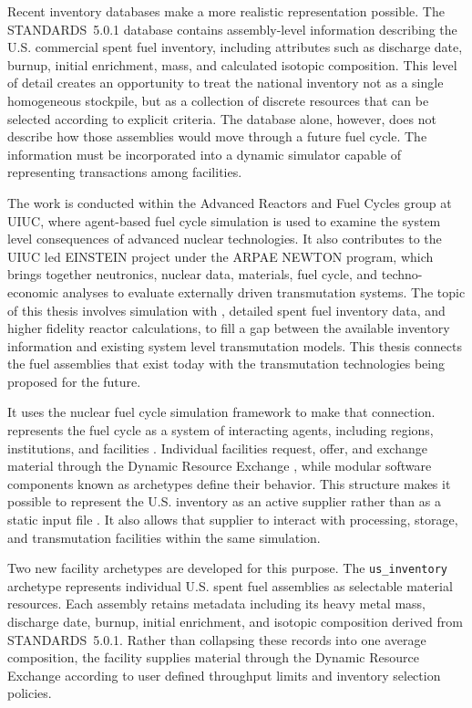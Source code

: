 Recent inventory databases make a more realistic representation possible.
The \gls{STANDARDS}~5.0.1 database \cite{peterson_unf-st&dards_2017,peterson_additional_2017}
contains assembly-level information describing
the U.S. commercial spent fuel inventory, including attributes such as
discharge date, burnup, initial enrichment, mass, and calculated isotopic
composition. This level of detail creates an opportunity to treat the
national inventory not as a single homogeneous stockpile, but as a collection
of discrete resources that can be selected according to explicit criteria.
The database alone, however, does not describe how those assemblies would
move through a future fuel cycle. The information must be incorporated into a
dynamic simulator capable of representing transactions among facilities.

The work is conducted within the Advanced Reactors and Fuel Cycles group at
\gls{UIUC}, where agent-based fuel cycle simulation is used to examine the
system level consequences of advanced nuclear technologies. It also
contributes to the UIUC led \gls{EINSTEIN} project under the \gls{ARPAE} \gls{NEWTON} program,
which brings together neutronics, nuclear data, materials, fuel cycle, and
techno-economic analyses to evaluate externally driven transmutation systems.
The topic of this thesis involves simulation with \Cyclus,
detailed spent fuel inventory data, and higher fidelity reactor calculations,
to fill a gap between the available inventory information and
existing system level transmutation models.
This thesis connects the fuel assemblies that exist today with the
transmutation technologies being proposed for the future.

It uses the \Cyclus nuclear fuel cycle simulation framework to make
that connection. \Cyclus represents the fuel cycle as a system of interacting
agents, including regions, institutions, and facilities \cite{huff_fundamental_2016}. Individual
facilities request, offer, and exchange material through the Dynamic Resource
Exchange \cite{giddenMethodologyDeterminingDynamic2016},
while modular software components known as archetypes define their
behavior. This structure makes it possible to represent the U.S. inventory as
an active supplier rather than as a static input file \cite{bae_deep_2020}. It also allows that
supplier to interact with processing, storage, and transmutation facilities
within the same simulation.

Two new facility archetypes are developed for this purpose. The
\texttt{us\_inventory} archetype represents individual U.S. spent fuel
assemblies as selectable material resources. Each assembly retains metadata
including its heavy metal mass, discharge date, burnup, initial enrichment,
and isotopic composition derived from \gls{STANDARDS}~5.0.1.
Rather than collapsing these records into one average composition, the facility supplies
material through the \Cyclus Dynamic Resource Exchange according to
user defined throughput limits and inventory selection policies.

